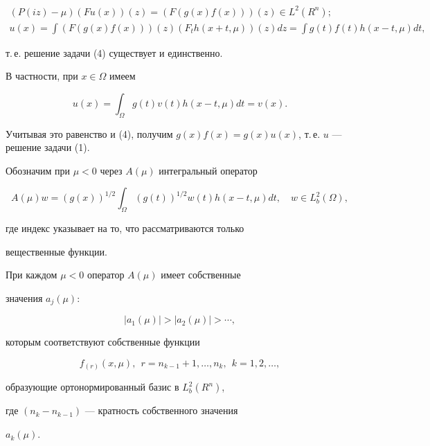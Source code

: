 \begin{pf}
\begin{gather*}


(P(iz)-\mu)(Fu(x))(z)= (F(g(x)f(x)))(z) \in L^{2}{(R^{n})}; \\


%


u(x)= \int (F(g(x)f(x)))(z) (F_{t} h(x+t,\mu))(z)dz = 


\int g(t)f(t) h(x-t,\mu) dt,


\end{gather*}


т.\,е. решение задачи (4) существует и единственно.


В частности, при $x \in \Omega$ имеем


$$


u(x)= \int_{ \Omega } g(t)v(t)h(x-t,\mu) dt = v(x).


$$


Учитывая это равенство и (4), получим $ g(x)f(x)=


g(x)u(x)$, т.\,е. $u$ --- решение задачи (1).


\end{pf}





Обозначим при $\mu <0$ через $A(\mu)$ интегральный оператор


$$


A(\mu)w= (g(x))^{1/2} \int_{\Omega} (g(t))^{1/2}


w(t)h(x-t,\mu) dt,\quad w \in L_{b}^{2}{(\Omega)},


$$


где индекс указывает на то, что рассматриваются только


вещественные функции.





\begin{lem}


При каждом $\mu <0 $ оператор $ A(\mu) $ имеет собственные


значения $ a_{j}(\mu):$


$$


| a_{1}(\mu) | > | a_{2}(\mu) | >\dotsb,


$$


которым соответствуют собственные функции


$$


f_{(r)}(x,\mu),\ \ r=n_{k-1} +1,\dotsc,n_{k},\ \ k=1,2,\dotsc,


$$


образующие ортонормированный базис в $L_{b}^{2}{(R^{n})}$,


где $( n_{k}-n_{k-1})$ --- кратность собственного значения


$a_{k}(\mu)$.


\end{lem}






